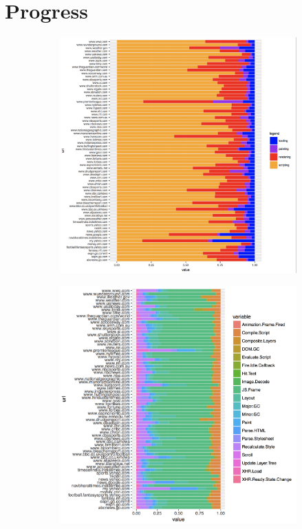 \section{Progress}
\label{sec:Progress}

\begin{figure}[!bth]
\begin{subfigure}[b]{0.5\textwidth}
\centering
\includegraphics[width=0.9\columnwidth]{figs/cat_p2.png}
\label{fig:act_p2}
\end{subfigure}
\begin{subfigure}[b]{0.5\textwidth}
\centering
\includegraphics[width=0.9\columnwidth]{figs/act_p2.png}
\label{fig:cat_p2}
\end{subfigure}
\end{figure}

